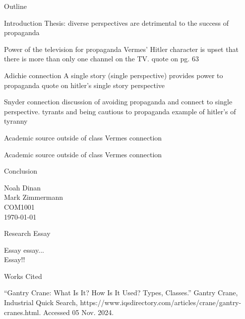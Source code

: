 \documentclass[12pt]{article}
\begin{document}
\begin{center}
Outline
\end{center}

\begin{outline}[enumerate]
\1 Introduction
    \2 Thesis: diverse perspectives are detrimental to the success of propaganda

\1 Power of the television for propaganda
    \2 Vermes' Hitler character is upset that there is more than only one channel on the TV.
    \2 quote on pg. 63

\1 Adichie connection
    \2 A single story (single perspective) provides power to propaganda
    \2 quote on hitler's single story perspective

\1 Snyder connection
    \2 discussion of avoiding propaganda and connect to single perspective.
    \2 tyrants and being cautious to propaganda
    \2 example of hitler's of tyranny

\1 Academic source outside of class 
    \2 Vermes connection

\1 Academic source outside of class 
    \2 Vermes connection

\1 Conclusion

\end{outline}

\newpage

\noindent
Noah Dinan \\ Mark Zimmermann \\ COM1001 \\ \today \\

\begin{center}
Research Essay
\end{center}

\setlength{\parindent}{0.5in}

Essay essay...\\

Essay!!

\newpage

\begin{center}
Works Cited
\end{center}

\begin{hangparas}{0.5in}{1}

“Gantry Crane: What Is It? How Is It Used? Types, Classes.” Gantry Crane, Industrial Quick Search,
https://www.iqsdirectory.com/articles/crane/gantry-cranes.html. Accessed 05 Nov. 2024. 

\end{hangparas}
\end{document}
